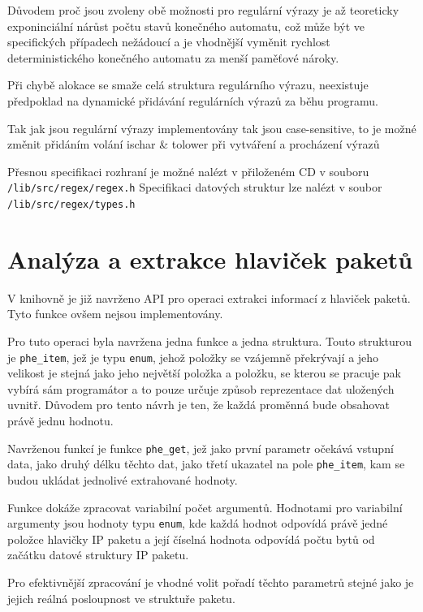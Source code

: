 Důvodem proč jsou zvoleny obě možnosti pro regulární výrazy je až teoreticky exponinciální nárůst
počtu stavů konečného automatu, což může být ve specifických případech nežádoucí a je vhodnější
vyměnit rychlost deterministického konečného automatu za menší paměťové nároky.


Při chybě alokace se smaže celá struktura regulárního výrazu, neexistuje předpoklad na
dynamické přidávání regulárních výrazů za běhu programu.

Tak jak jsou regulární výrazy implementovány tak jsou case-sensitive, to je možné změnit
přidáním volání ischar \& tolower při vytváření a procházení výrazů

Přesnou specifikaci rozhraní je možné nalézt v přiloženém CD v souboru \texttt{/lib/src/regex/regex.h}
Specifikaci datových struktur lze nalézt v soubor \texttt{/lib/src/regex/types.h}

\section{Analýza a extrakce hlaviček paketů}\label{api:phe} %

V knihovně je již navrženo API pro operaci extrakci informací z hlaviček paketů. Tyto
funkce ovšem nejsou implementovány.

Pro tuto operaci byla navržena jedna funkce a jedna struktura.
Touto strukturou je \texttt{phe\_item}, jež je typu \texttt{enum}, jehož položky
se vzájemně překrývají a jeho velikost je stejná jako jeho největší položka a
položku, se kterou se pracuje pak vybírá sám programátor a to pouze určuje způsob reprezentace
dat uložených uvnitř. Důvodem pro tento návrh je ten, že každá proměnná bude obsahovat právě jednu hodnotu.

Navrženou funkcí je funkce \texttt{phe\_get}, jež jako první parametr očekává
vstupní data, jako druhý délku těchto dat, jako třetí ukazatel na pole \texttt{phe\_item},
kam se budou ukládat jednolivé extrahované hodnoty.

Funkce dokáže zpracovat variabilní počet argumentů.
Hodnotami pro variabilní argumenty jsou hodnoty typu \texttt{enum}, kde každá hodnot odpovídá
právě jedné položce hlavičky IP paketu a její číselná hodnota odpovídá počtu bytů
od začátku datové struktury IP paketu.

Pro efektivnější zpracování je vhodné volit pořadí těchto parametrů stejné jako je jejich reálná
posloupnost ve struktuře paketu.

